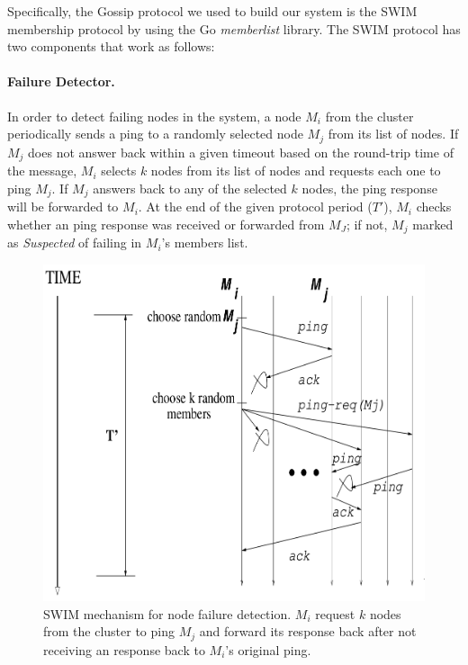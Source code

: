 Specifically, the Gossip protocol we used to build our system is the SWIM membership protocol\cite{SWIM} by using the Go \textit{memberlist} library\cite{memberlist}. The SWIM protocol has two components that work as follows\cite{SWIM}:

\paragraph*{Failure Detector.} In order to detect failing nodes in the system, a node $M_{i}$ from the cluster periodically sends a ping to a randomly selected node $M_{j}$ from its list of nodes. If $M_{j}$ does not answer back within a given timeout based on the round-trip time of the message, $M_i$ selects $k$ nodes from its list of nodes and requests each one to ping $M_j$. If $M_{j}$ answers back to any of the selected $k$ nodes, the ping response will be forwarded to $M_{i}$. At the end of the given protocol period ($T'$), $M_{i}$ checks whether an ping response was received or forwarded from $M_J$; if not, $M_{j}$ marked as \textit{Suspected} of failing in $M_{i}$'s members list.

\begin{figure}[h!]
		\centering
    	\includegraphics[scale=0.25]{assets/images/swim_net.png}
    	\caption{SWIM mechanism for node failure detection. $M_{i}$ request $k$ nodes from the cluster to ping $M_{j}$ and forward its response back after not receiving an response back to $M_{i}$'s original ping. \cite{SWIM}}
    	\label{image:web-milestone2}
\end{figure}

